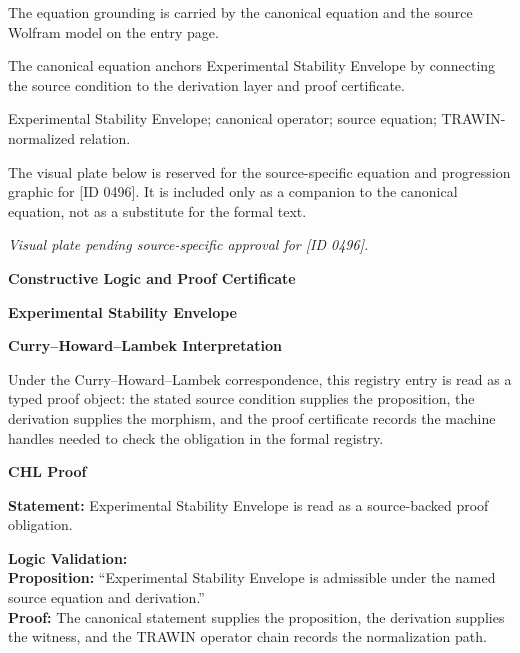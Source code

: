 The equation grounding is carried by the canonical equation and the source Wolfram model on the entry page.

The canonical equation anchors Experimental Stability Envelope by connecting the source condition to the derivation layer and proof certificate.

Experimental Stability Envelope; canonical operator; source equation; TRAWIN-normalized relation.
\endgroup

\begingroup\footnotesize\sloppy
The visual plate below is reserved for the source-specific equation and progression graphic for [ID 0496]. It is included only as a companion to the canonical equation, not as a substitute for the formal text.
\par\endgroup
\begingroup\footnotesize\itshape
Visual plate pending source-specific approval for [ID 0496].
\par\endgroup

\clearpage
\begingroup\tzpsupportsetup
\noindent\textbf{\fontsize{10.8pt}{12.8pt}\selectfont [ID 0496] Constructive Logic and Proof Certificate}\par
\noindent\textbf{\fontsize{10pt}{12pt}\selectfont Experimental Stability Envelope}\par
\vspace{0.45em}
\begingroup
\footnotesize
\setlength{\parskip}{0.22em}
\setlength{\parindent}{0pt}
\noindent\textbf{Curry--Howard--Lambek Interpretation}\par
Under the Curry--Howard--Lambek correspondence, this registry entry is read as a typed proof
object: the stated source condition supplies the proposition, the derivation supplies the
morphism, and the proof certificate records the machine handles needed to check the obligation
in the formal registry.

\vspace{0.45em}
\noindent\textbf{CHL Proof}\par
\textbf{Statement:} Experimental Stability Envelope is read as a source-backed proof obligation.

\textbf{Logic Validation:}\\
\textbf{Proposition:} ``Experimental Stability Envelope is admissible under the named source equation and derivation.''\\
\textbf{Proof:} The canonical statement supplies the proposition, the derivation supplies the witness, and the TRAWIN operator chain records the normalization path.

